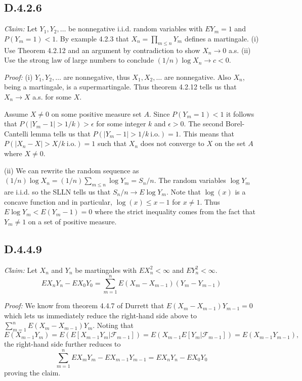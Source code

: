 \documentclass[10pt]{article}
\begin{document}
\subsection*{D.4.2.6}
\textit{Claim:} Let $Y_1,Y_2, \dots$ be nonnegative i.i.d. random variables
with $EY_m = 1$ and $P(Y_m =1) < 1$. By example 4.2.3 that 
$X_n = \prod_{m \le n} Y_m$ defines a martingale. (i) Use Theorem 4.2.12
and an argument by contradiction to show $X_n \to 0$ a.s. (ii) Use the strong
law of large numbers to conclude $(1/n) \log X_n \to c < 0$.

\textit{Proof:} (i) $Y_1,Y_2,\dots$ are nonnegative, thus $X_1,X_2,\dots$
are nonnegative. Also $X_n$, being a martingale, is a supermartingale. 
Thus theorem 4.2.12 tells us that $X_n \to X$ a.s.
for some $X$.

Assume $X \ne 0$ on some positive measure set $A$. 
Since $P(Y_m =1) < 1$ it follows that 
$P(\vert Y_m - 1 \vert > 1/k) > \epsilon$ for some integer $k$
and $\epsilon >0$. The second Borel-Cantelli lemma tells us that 
$P(\vert Y_m - 1 \vert > 1/k \ \text{i.o.}) = 1$. This means that
$P(\vert X_n - X \vert > X/k \ \text{i.o.}) = 1$ such that 
$X_n$ does not converge to $X$ on the set $A$ where $X \ne 0$.

(ii) We can rewrite the random sequence as 
$(1/n)\log X_n = (1/n) \sum_{m \le n} \log Y_m = S_n/n$. The random variables
$\log Y_m$ are i.i.d. so the SLLN tells us that $S_n/n \to E\log Y_m$.
Note that $\log(x)$ is a concave function and in particular,
$\log(x) \le x-1$ for $x \ne 1$. Thus $E \log Y_m < E(Y_m - 1) = 0$
where the strict inequality comes from the fact that $Y_m \ne 1$
on a set of positive measure.

\subsection*{D.4.4.9}
\textit{Claim:} Let $X_n$ and $Y_n$ be martingales with $EX_n^2 < \infty$
and $EY_n^2 < \infty$.
\begin{equation*}
  EX_nY_n - EX_0Y_0 = \sum_{m=1}^n E(X_m - X_{m-1})(Y_m - Y_{m-1})
\end{equation*}

\textit{Proof:} We know from theorem 4.4.7 of Durrett that
$E(X_m-X_{m-1})Y_{m-1} = 0$ which lets us immediately reduce the
right-hand side above to $\sum_{m=1}^n E(X_m - X_{m-1})Y_m$.
Noting that $$E(X_{m-1}Y_m) = E(E[X_{m-1}Y_m \vert \mathcal{F}_{m-1}])
= E(X_{m-1}E[Y_m \vert \mathcal{F}_{m-1}]) = E(X_{m-1}Y_{m-1}),$$
the right-hand side further reduces to
\begin{equation*}
  \sum_{m=1}^n EX_mY_m - EX_{m-1}Y_{m-1} = EX_nY_n - EX_0Y_0
\end{equation*}
proving the claim.
\end{document}
